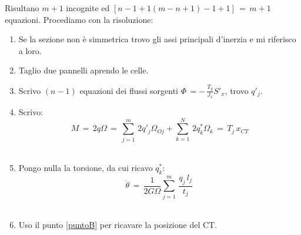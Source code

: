 Risultano $m+1$ incognite ed $[n-1+1(m-n+1)-1+1]\,=\,m+1$ equazioni. Procediamo con la risoluzione:
\begin{enumerate}
    \item Se la sezione non è simmetrica trovo gli assi principali d'inerzia e mi riferisco a loro.\\
    \item Taglio due pannelli aprendo le celle.\\
    \item Scrivo $(n-1)$ equazioni dei flussi sorgenti $ \Phi\, = -\, \frac{T_y}{J_x}S'_x  $, trovo $q'_j$.\\
    \item Scrivo:
    \label{puntoB}
    \begin{equation*}
        M\,=\,2q\Omega\,=\, \sum^m_{j=1}\,2q'_j\Omega_{Oj} +\sum^N_{k=1}\,2q^*_k\Omega_{k}\,=\, T_j \,x_{CT}
    \end{equation*}\\
    \item Pongo nulla la torsione, da cui ricavo $q^*_k$:
    \begin{equation*}
        \dot{\theta}\,=\,\frac{1}{2G\Omega}\sum^m_{j=1}\,\frac{q_j\,l_j}{t_j}\,
    \end{equation*}\\
    \item Uso il punto \ref{puntoB} per ricavare la posizione del CT.
    
\end{enumerate}


